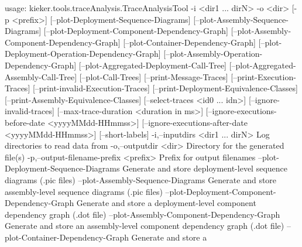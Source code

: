 usage: kieker.tools.traceAnalysis.TraceAnalysisTool -i <dir1 ... dirN> -o <dir>
       [-p <prefix>] [--plot-Deployment-Sequence-Diagrams]
       [--plot-Assembly-Sequence-Diagrams]
       [--plot-Deployment-Component-Dependency-Graph]
       [--plot-Assembly-Component-Dependency-Graph]
       [--plot-Container-Dependency-Graph]
       [--plot-Deployment-Operation-Dependency-Graph]
       [--plot-Assembly-Operation-Dependency-Graph]
       [--plot-Aggregated-Deployment-Call-Tree]
       [--plot-Aggregated-Assembly-Call-Tree] [--plot-Call-Trees]
       [--print-Message-Traces] [--print-Execution-Traces]
       [--print-invalid-Execution-Traces]
       [--print-Deployment-Equivalence-Classes]
       [--print-Assembly-Equivalence-Classes] [--select-traces <id0 ... idn>]
       [--ignore-invalid-traces] [--max-trace-duration <duration in ms>]
       [--ignore-executions-before-date <yyyyMMdd-HHmmss>]
       [--ignore-executions-after-date <yyyyMMdd-HHmmss>] [--short-labels]
 -i,--inputdirs <dir1 ... dirN>                         Log directories to read
                                                        data from
 -o,--outputdir <dir>                                   Directory for the
                                                        generated file(s)
 -p,--output-filename-prefix <prefix>                   Prefix for output
                                                        filenames
    --plot-Deployment-Sequence-Diagrams                 Generate and store
                                                        deployment-level
                                                        sequence diagrams (.pic
                                                        files)
    --plot-Assembly-Sequence-Diagrams                   Generate and store
                                                        assembly-level sequence
                                                        diagrams (.pic files)
    --plot-Deployment-Component-Dependency-Graph        Generate and store a
                                                        deployment-level
                                                        component dependency
                                                        graph (.dot file)
    --plot-Assembly-Component-Dependency-Graph          Generate and store an
                                                        assembly-level component
                                                        dependency graph (.dot
                                                        file)
    --plot-Container-Dependency-Graph                   Generate and store a
